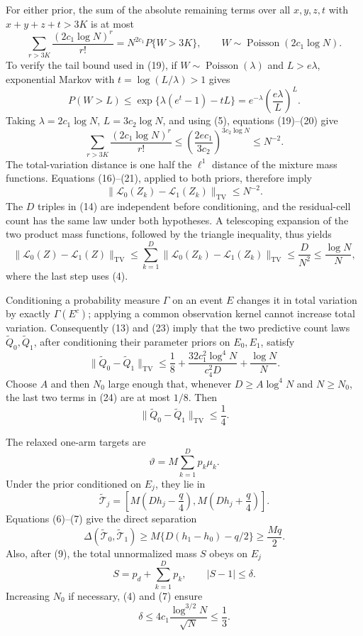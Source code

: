 For either prior, the sum of the absolute remaining terms over all \(x,y,z,t\) with \(x+y+z+t>3K\) is at most
\[
 \sum_{r>3K}\frac{(2c_1\log N)^r}{r!}
 =N^{2c_1}P\{W>3K\},
 \qquad W\sim\operatorname{Poisson}(2c_1\log N).
\tag{19}
\]
To verify the tail bound used in (19), if \(W\sim\operatorname{Poisson}(\lambda)\) and \(L>e\lambda\), exponential Markov with \(t=\log(L/\lambda)>1\) gives
\[
 P(W>L)
 \le \exp\{\lambda(e^t-1)-tL\}
 =e^{-\lambda}\left(\frac{e\lambda}{L}\right)^L.
\tag{20}
\]
Taking \(\lambda=2c_1\log N\), \(L=3c_2\log N\), and using (5), equations (19)--(20) give
\[
 \sum_{r>3K}\frac{(2c_1\log N)^r}{r!}
 \le
 \left(\frac{2ec_1}{3c_2}\right)^{3c_2\log N}
 \le N^{-2}.
\tag{21}
\]
The total-variation distance is one half the \(\ell^1\) distance of the mixture mass functions.  Equations (16)--(21), applied to both priors, therefore imply
\[
 \|\mathcal L_0(Z_k)-\mathcal L_1(Z_k)\|_{\mathrm{TV}}
 \le N^{-2}.
\tag{22}
\]
The \(D\) triples in (14) are independent before conditioning, and the residual-cell count has the same law under both hypotheses.  A telescoping expansion of the two product mass functions, followed by the triangle inequality, thus yields
\[
 \|\mathcal L_0(Z)-\mathcal L_1(Z)\|_{\mathrm{TV}}
 \le \sum_{k=1}^D
 \|\mathcal L_0(Z_k)-\mathcal L_1(Z_k)\|_{\mathrm{TV}}
 \le \frac{D}{N^2}
 \le \frac{\log N}{N},
\tag{23}
\]
where the last step uses (4).

Conditioning a probability measure \(\Gamma\) on an event \(E\) changes it in total variation by exactly \(\Gamma(E^c)\); applying a common observation kernel cannot increase total variation.  Consequently (13) and (23) imply that the two predictive count laws \(\widetilde Q_0,\widetilde Q_1\), after conditioning their parameter priors on \(E_0,E_1\), satisfy
\[
 \|\widetilde Q_0-\widetilde Q_1\|_{\mathrm{TV}}
 \le \frac18
 +\frac{32c_1^2\log^4N}{c_4^2D}
 +\frac{\log N}{N}.
\tag{24}
\]
Choose \(A\) and then \(N_0\) large enough that, whenever
\(D\ge A\log^4N\) and \(N\ge N_0\), the last two terms in (24) are at most \(1/8\).  Then
\[
 \|\widetilde Q_0-\widetilde Q_1\|_{\mathrm{TV}}\le\frac14.
\tag{25}
\]

The relaxed one-arm targets are
\[
 \vartheta=M\sum_{k=1}^D p_k\mu_k.
\tag{26}
\]
Under the prior conditioned on \(E_j\), they lie in
\[
 \widetilde{\mathcal T}_j
 =\left[M\left(Dh_j-\frac q4\right),
         M\left(Dh_j+\frac q4\right)\right].
\tag{27}
\]
Equations (6)--(7) give the direct separation
\[
 \Delta(\widetilde{\mathcal T}_0,\widetilde{\mathcal T}_1)
 \ge M\{D(h_1-h_0)-q/2\}
 \ge \frac{Mq}{2}.
\tag{28}
\]
Also, after (9), the total unnormalized mass \(S\) obeys on \(E_j\)
\[
 S=p_d+\sum_{k=1}^D p_k,
 \qquad |S-1|\le\delta.
\tag{29}
\]
Increasing \(N_0\) if necessary, (4) and (7) ensure
\[
 \delta\le4c_1\frac{\log^{3/2}N}{\sqrt N}\le\frac13.
\tag{30}
\]

